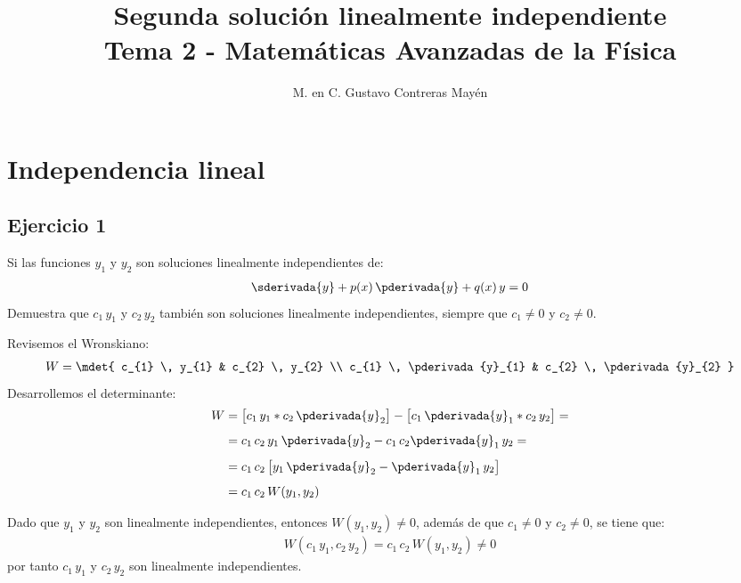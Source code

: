 
\title{Segunda solución linealmente independiente \\ \large {Tema 2 - Matemáticas Avanzadas de la Física}\vspace{-3ex}}

\author{M. en C. Gustavo Contreras Mayén}
\date{ }

\pagestyle{fancy}
\fancyhf{}
\lhead{\leftmark}
\rfoot{\thepage}
\setlength{\headheight}{16pt}%



\maketitle
\fontsize{14}{14}\selectfont

\section{Independencia lineal}

\subsection{Ejercicio 1}

\begin{ejemplo}
Si las funciones $y_{1}$ y $y_{2}$ son soluciones linealmente independientes de:
\begin{align*}
\sderivada{y} + p(x) \, \pderivada{y} + q(x) \, y = 0
\end{align*}
Demuestra que $c_{1} \, y_{1}$ y $c_{2} \, y_{2}$ también son soluciones linealmente independientes, siempre que $c_{1} \neq 0$ y $c_{2} \neq 0$.
\par
Revisemos el Wronskiano:
\begin{align*}
W = \mdet{
c_{1} \, y_{1} & c_{2} \, y_{2} \\ 
c_{1} \, \pderivada{y}_{1} & c_{2} \, \pderivada{y}_{2}
}
\end{align*}
Desarrollemos el determinante:
\begin{align*}
W &= \big[ c_{1} \, y_{1} * c_{2} \, \pderivada{y}_{2} \big] - \big[ c_{1} \, \pderivada{y}_{1} * c_{2} \, y_{2} \big] = \\[0.5em] 
&= c_{1} \, c_{2} \, y_{1} \, \pderivada{y}_{2} - c_{1} \, c_{2} \pderivada{y}_{1} \, y_{2} = \\[0.5em] 
&= c_{1} \, c_{2} \, \big[ y_{1} \, \pderivada{y}_{2} - \pderivada{y}_{1} \, y_{2} \big] \\[0.5em] 
&= c_{1} \, c_{2} \, W(y_{1}, y_{2})
\end{align*}

Dado que $y_{1}$ y $y_{2}$ son linealmente independientes, entonces $W(y_{1}, y_{2}) \neq 0$, además de que $c_{1} \neq 0$ y $c_{2} \neq 0$, se tiene que:
\begin{align*}
W(c_{1} \, y_{1}, c_{2} \, y_{2}) = c_{1} \, c_{2} \, W(y_{1}, y_{2}) \neq 0
\end{align*}
por tanto $c_{1} \, y_{1}$ y $c_{2} \, y_{2}$ son linealmente independientes.
\end{ejemplo}

